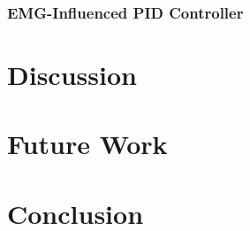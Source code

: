 \documentclass[a4paper,twoside,11pt]{report} %
\begin{document}
\subsection{EMG-Influenced PID Controller}
\chapter{Discussion}
\chapter{Future Work}
\chapter{Conclusion}


\cleardoublepage 

\printbibliography[heading=bibintoc,title={Bibliography}]
\cleardoublepage 
\appendix

\cleartoleftpage

\end{document}
